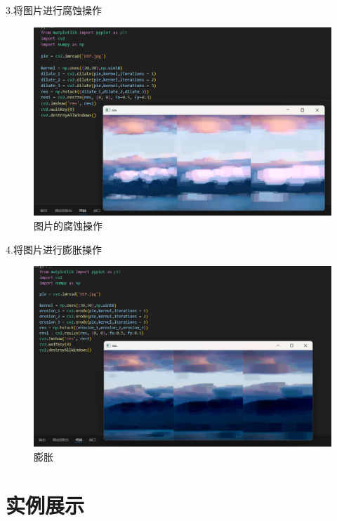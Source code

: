 \documentclass[a4paper, 12pt]{article}
\begin{document}
3.将图片进行腐蚀操作
\begin{figure}[H]
  \centering
  \includegraphics[width=\textwidth]{屏幕截图 2024-09-12 201525.png}
  \caption{图片的腐蚀操作}
\end{figure}

4.将图片进行膨胀操作
\begin{figure}[H]
  \centering
  \includegraphics[width=\textwidth]{屏幕截图 2024-09-12 201917.png}
  \caption{膨胀}
\end{figure}


\section{实例展示}
\end{document}
